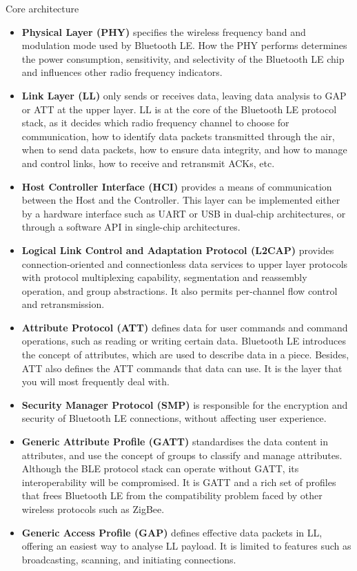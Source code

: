 \documentclass[a4paper,12pt]{book}
\begin{document}
\begin{term}{Core architecture}
    \begin{itemize}
        \item \textbf{Physical Layer (PHY)} specifies the wireless frequency band and modulation mode used by Bluetooth LE. How the PHY performs determines the power consumption, sensitivity, and selectivity of the Bluetooth LE chip and influences other radio frequency indicators.
        \item \textbf{Link Layer (LL)} only sends or receives data, leaving data analysis to GAP or ATT at the upper layer. LL is at the core of the Bluetooth LE protocol stack, as it decides which radio frequency channel to choose for communication, how to identify data packets transmitted through the air, when to send data packets, how to ensure data integrity, and how to manage and control links, how to receive and retransmit ACKs, etc.
        \item \textbf{Host Controller Interface (HCI)} provides a means of communication between the Host and the Controller. This layer can be implemented either by a hardware interface such as UART or USB in dual-chip architectures, or through a software API in single-chip architectures.
        \item \textbf{Logical Link Control and Adaptation Protocol (L2CAP)} provides connection-oriented and connectionless data services to upper layer protocols with protocol multiplexing capability, segmentation and reassembly operation, and group abstractions. It also permits per-channel flow control and retransmission.
        \item \textbf{Attribute Protocol (ATT)} defines data for user commands and command operations, such as reading or writing certain data. Bluetooth LE introduces the concept of attributes, which are used to describe data in a piece. Besides, ATT also defines the ATT commands that data can use. It is the layer that you will most frequently deal with.
        \item \textbf{Security Manager Protocol (SMP)} is responsible for the encryption and security of Bluetooth LE connections, without affecting user experience.
        \item \textbf{Generic Attribute Profile (GATT)} standardises the data content in attributes, and use the concept of groups to classify and manage attributes. Although the BLE protocol stack can operate without GATT, its interoperability will be compromised. It is GATT and a rich set of profiles that frees Bluetooth LE from the compatibility problem faced by other wireless protocols such as ZigBee.
        \item \textbf{Generic Access Profile (GAP)} defines effective data packets in LL, offering an easiest way to analyse LL payload. It is limited to features such as broadcasting, scanning, and initiating connections. 
    \end{itemize}
\end{term}
\end{document}
